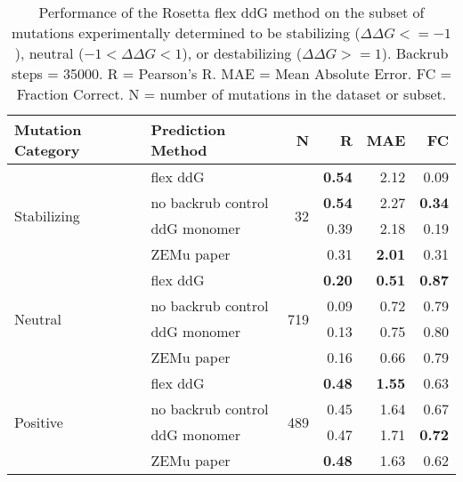 \begin{table}
  \begin{tabular}{llrrrr}
\toprule
Mutation Category &   Prediction Method &    N &    R &  MAE &   FC \\
\midrule
 \multirow{ 4}{*}{Stabilizing} & flex ddG & \multirow{ 4}{*}{32} & \textbf{0.54} & 2.12 & 0.09  \\
 & no backrub control & & \textbf{0.54} & 2.27 & \textbf{0.34}  \\
 & ddG monomer & & 0.39 & 2.18 & 0.19  \\
 & ZEMu paper & & 0.31 & \textbf{2.01} & 0.31  \\
\hline
 \multirow{ 4}{*}{Neutral} & flex ddG & \multirow{ 4}{*}{719} & \textbf{0.20} & \textbf{0.51} & \textbf{0.87}  \\
 & no backrub control & & 0.09 & 0.72 & 0.79  \\
 & ddG monomer & & 0.13 & 0.75 & 0.80  \\
 & ZEMu paper & & 0.16 & 0.66 & 0.79  \\
\hline
 \multirow{ 4}{*}{Positive} & flex ddG & \multirow{ 4}{*}{489} & \textbf{0.48} & \textbf{1.55} & 0.63  \\
 & no backrub control & & 0.45 & 1.64 & 0.67  \\
 & ddG monomer & & 0.47 & 1.71 & \textbf{0.72}  \\
 & ZEMu paper & & \textbf{0.48} & 1.63 & 0.62  \\
\bottomrule
\end{tabular}
  \caption[Flex ddG performance on stabilizing mutations]{
    Performance of the Rosetta flex ddG method on the subset of mutations experimentally determined to be stabilizing ($\Delta\Delta G <= -1$), neutral ($-1 < \Delta\Delta G < 1$), or destabilizing ($\Delta\Delta G >= 1$). Backrub steps = 35000. R = Pearson's R. MAE = Mean Absolute Error. FC = Fraction Correct. N = number of mutations in the dataset or subset.
  } \label{tab:table-stabilizing}
\end{table}
